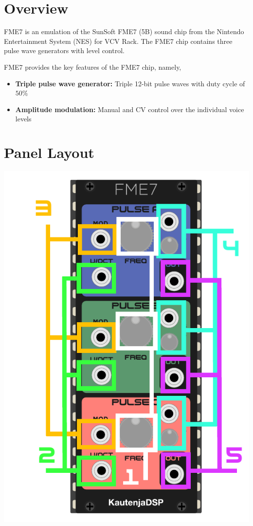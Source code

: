 \documentclass[12pt,a4paper]{article}
\begin{document}

\section{Overview}

FME7 is an emulation of the SunSoft FME7 (5B) sound chip from the Nintendo Entertainment System (NES) for VCV Rack. The FME7 chip contains three pulse wave generators with level control.

FME7 provides the key features of the FME7 chip, namely,
\begin{itemize}
  \item \textbf{Triple pulse wave generator:} Triple 12-bit pulse waves with duty cycle of $50\%$
  \item \textbf{Amplitude modulation:} Manual and CV control over the individual voice levels
\end{itemize}


\section{Panel Layout}

\begin{center}
\includegraphics{FME7-Manual}
\end{center}
\end{document}
